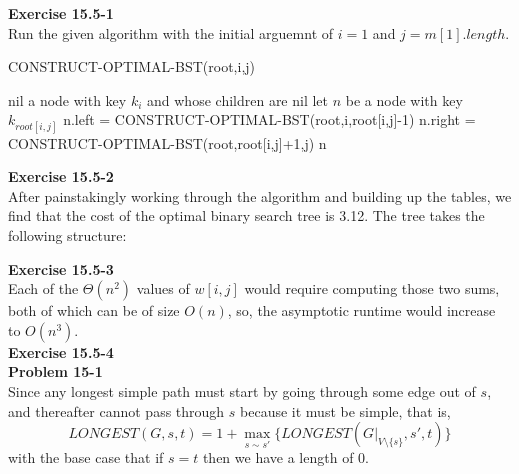 \documentclass{article}
\begin{document}
\noindent\textbf{Exercise 15.5-1}\\

Run the given algorithm with the initial arguemnt of $i=1$ and $j= m[1].length$.

\begin{algorithm}
\caption{CONSTRUCT-OPTIMAL-BST(root,i,j)}
\begin{algorithmic}
\State \Return nil
\EndIf
{}
\State \Return a node with key $k_i$ and whose children are nil
\EndIf
\State let $n$ be a node with key $k_{root[i,j]}$
\State n.left = CONSTRUCT-OPTIMAL-BST(root,i,root[i,j]-1)
\State n.right = CONSTRUCT-OPTIMAL-BST(root,root[i,j]+1,j)
\State \Return n
\end{algorithmic}
\end{algorithm}

\noindent\textbf{Exercise 15.5-2}\\

After painstakingly working through the algorithm and building up the tables, we find that the cost of the optimal binary search tree is 3.12.  The tree takes the following structure:


\noindent\textbf{Exercise 15.5-3}\\

Each of the $\Theta(n^2)$ values of $w[i,j]$ would require computing those two sums, both of which can be of size $O(n)$, so, the asymptotic runtime would increase to $O(n^3)$.\\

\noindent\textbf{Exercise 15.5-4}\\


\noindent\textbf{Problem 15-1}\\

Since any longest simple path must start by going through some edge out of $s$, and thereafter cannot pass through $s$ because it must be simple, that is, 
\[
LONGEST(G,s,t) = 1+\max_{s\sim s'} \{ LONGEST(G|_{V\setminus\{s\}},s',t)\}
\]
with the base case that if $s=t$ then we have a length of 0.
\end{document}
